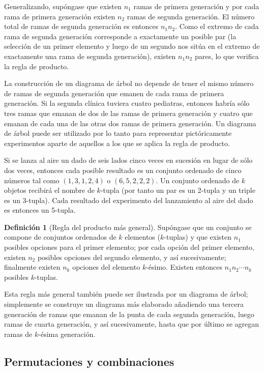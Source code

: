 \documentclass[
  11pt,
]{book}
\theoremstyle{definition}
\newtheorem{definition}{Definición}[chapter]
\theoremstyle{definition}
\theoremstyle{definition}
\theoremstyle{definition}
\theoremstyle{remark}
\begin{document}
Generalizando, supóngase que existen \(n_{1}\) ramas de primera generación y por cada rama de primera generación existen \(n_{2}\) ramas de segunda generación. El número total de ramas de segunda generación es entonces \(n_{1}n_{2}\). Como el extremo de cada rama de segunda generación corresponde a exactamente un posible par (la selección de un primer elemento y luego de un segundo nos sitúa en el extremo de exactamente una rama de segunda generación), existen \(n_{1}n_{2}\) pares, lo que verifica la regla de producto.

La construcción de un diagrama de árbol no depende de tener el mismo número de ramas de segunda generación que emanen de cada rama de primera generación. Si la segunda clínica tuviera cuatro pediatras, entonces habría sólo tres ramas que emanan de dos de las ramas de primera generación y cuatro que emanan de cada una de las otras dos ramas de primera generación. Un diagrama de árbol puede ser utilizado por lo tanto para representar pictóricamente experimentos aparte de aquellos a los que se aplica la regla de producto.

Si se lanza al aire un dado de seis lados cinco veces en sucesión en lugar de sólo dos veces, entonces cada posible resultado es un conjunto ordenado de cinco números tal como \((1, 3, 1, 2, 4)\) o \((6, 5, 2, 2, 2)\). Un conjunto ordenado de \(k\) objetos recibirá el nombre de \(k\)-tupla (por tanto un par es un 2-tupla y un triple es un 3-tupla). Cada resultado del experimento del lanzamiento al aire del dado es entonces un 5-tupla.

\begin{definition}[Regla del producto más general]
Supóngase que un conjunto se compone de conjuntos ordenados de \(k\) elementos (\(k\)-tuplas) y que existen \(n_1\) posibles opciones para el primer elemento; por cada opción del primer elemento, existen \(n_2\) posibles opciones del segundo elemento, y así sucesivamente; finalmente existen \(n_k\) opciones del elemento \(k\)-ésimo. Existen entonces \(n_1n_2 \cdots n_k\) posibles \(k\)-tuplas.
\end{definition}

Esta regla más general también puede ser ilustrada por un diagrama de árbol; simplemente se construye un diagrama más elaborado añadiendo una tercera generación de ramas que emanan de la punta de cada segunda generación, luego ramas de cuarta generación, y así sucesivamente, hasta que por último se agregan ramas de \(k\)-ésima generación.

\subsection{Permutaciones y combinaciones}\label{permutaciones-y-combinaciones}
\end{document}
